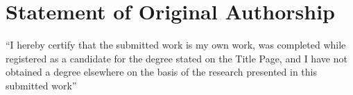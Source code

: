 \chapter{Statement of Original Authorship}

\vspace{4cm}

``I hereby certify that the submitted work is my own work, was completed while registered as a candidate for the degree stated on the Title Page, and I have not obtained a degree elsewhere on the basis of the research presented in this submitted work''
